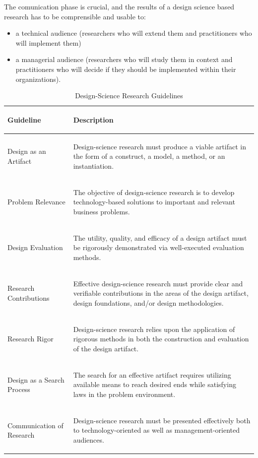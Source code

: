 \documentclass[]{book}
\providecommand{\tightlist}{%
  \setlength{\itemsep}{0pt}\setlength{\parskip}{0pt}}
\begin{document}
The comunication phase is crucial, and the results of a design science
based research has to be comprensible and usable to:

\begin{itemize}
\tightlist
\item
  a technical audience (researchers who will extend them and
  practitioners who will implement them)
\item
  a managerial audience (researchers who will study them in context and
  practitioners who will decide if they should be implemented within
  their organizations).
\end{itemize}

\begin{table}

\caption{\label{tab:introdesignscience}Design-Science Research Guidelines}
\centering
\begin{tabular}[t]{>{}l>{\em\raggedright\arraybackslash}p{30em}}
\toprule
Guideline & Description\\
\midrule
Design as an Artifact & Design-science research must produce a viable artifact in the form of a construct, a model, a method, or an instantiation.\\
Problem Relevance & The objective of design-science research is to develop technology-based solutions to important and relevant business problems.\\
Design Evaluation & The utility, quality, and efficacy of a design artifact must be rigorously demonstrated via well-executed evaluation methods.\\
Research Contributions & Effective design-science research must provide clear and verifiable contributions in the areas of the design artifact, design foundations, and/or design methodologies.\\
Research Rigor & Design-science research relies upon the application of rigorous methods in both the construction and evaluation of the design artifact.\\
\addlinespace
Design as a Search Process & The search for an effective artifact requires utilizing available means to reach desired ends while satisfying laws in the problem environment.\\
Communication of Research & Design-science research must be presented effectively both to technology-oriented as well as management-oriented audiences.\\
\bottomrule
\end{tabular}
\end{table}
\end{document}
